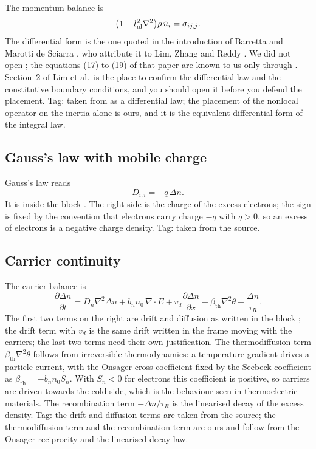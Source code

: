 \documentclass[11pt,a4paper]{article}
\newcommand{\bth}{\beta_{\mathrm{th}}}
\begin{document}
The momentum balance is
\begin{equation}\label{eq:mom}
\bigl(1-l_{\rm nl}^2\nabla^2\bigr)\rho\,\ddot u_i=\sigma_{ij,j}.
\end{equation}
The differential form is the one quoted in the introduction of Barretta
and Marotti de Sciarra \cite[Eqs.~(18)--(19)]{Barretta2018}, who attribute it to Lim, Zhang and Reddy
\cite{Lim2015}. We did not open \cite{Lim2015}; the equations (17) to (19) of that paper are known to us
only through \cite[Eqs.~(18)--(19)]{Barretta2018}. Section~2 of Lim et al.\ is the place to confirm the
differential law and the constitutive boundary conditions, and you should open it before you defend the
placement.
Tag: taken from \cite{Barretta2018} as a differential law; the placement of the nonlocal operator on the
inertia alone is ours, and it is the equivalent differential form of the integral law.

\subsection{Gauss's law with mobile charge}

Gauss's law reads
\begin{equation}\label{eq:gauss}
D_{i,i}=-q\,\Delta n .
\end{equation}
It is inside the block \cite[Eqs.~(1)--(7)]{Zhu2023}. The right side
is the charge of the excess electrons; the sign is fixed by the convention that electrons carry charge $-q$
with $q>0$, so an excess of electrons is a negative charge density.
Tag: taken from the source.

\subsection{Carrier continuity}

The carrier balance is
\begin{equation}\label{eq:carr}
\frac{\partial\Delta n}{\partial t}
=D_n\nabla^2\Delta n+b_nn_0\,\nabla\!\cdot\!E
+v_d\frac{\partial\Delta n}{\partial x}+\bth\nabla^2\theta-\frac{\Delta n}{\tau_R}.
\end{equation}
The first two terms on the right are drift and diffusion as written in
the block \cite[Eqs.~(1)--(7)]{Zhu2023}; the drift term with $v_d$ is the same drift written in the frame
moving with the carriers; the last two terms need their own justification.
The thermodiffusion term $\bth\nabla^2\theta$ follows from irreversible thermodynamics: a temperature
gradient drives a particle current, with the Onsager cross coefficient fixed by the Seebeck coefficient as
$\bth=-b_nn_0S_n$. With $S_n<0$ for electrons this coefficient is positive, so carriers are driven towards
the cold side, which is the behaviour seen in thermoelectric materials.
The recombination term $-\Delta n/\tau_R$ is the linearised decay of the excess density.
Tag: the drift and diffusion terms are taken from the source; the thermodiffusion term and the
recombination term are ours and follow from the Onsager reciprocity and the linearised decay law.
\end{document}
